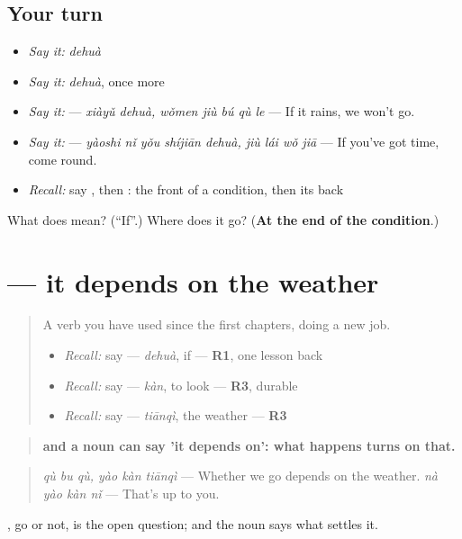 \subsection*{Your turn}
\begin{itemize}
\raggedright
  \item \emph{Say it:} \emph{dehuà}
  \item \emph{Say it:} \emph{dehuà}, once more
  \item \emph{Say it:}   — \emph{xiàyǔ dehuà, wǒmen jiù bú qù le} — If it rains, we won't go.
  \item \emph{Say it:}   — \emph{yàoshi nǐ yǒu shíjiān dehuà, jiù lái wǒ jiā} — If you've got time, come round.
  \item \emph{Recall:} say , then : the front of a condition, then its back
\end{itemize}

\begin{tcolorbox}[breakable,colback=teal!4,colframe=teal!35!black,title={Before you move on}]
What does  mean? (\textquotedblleft{}If\textquotedblright{}.) Where does it go? (\textbf{At the end of the condition}.)
\end{tcolorbox}
\section[\texorpdfstring{\zh{看天气} (kàn tiānqì)}{看天气 (kàn tiānqì)}]{ — it depends on the weather}

\label{lesson:ZH-C288-depends}



\begin{quote}
A verb you have used since the first chapters, doing a new job.

\begin{itemize}
\raggedright
  \item \emph{Recall:} say  — \emph{dehuà}, if — \textbf{R1}, one lesson back
  \item \emph{Recall:} say  — \emph{kàn}, to look — \textbf{R3}, durable
  \item \emph{Recall:} say  — \emph{tiānqì}, the weather — \textbf{R3}
\end{itemize}
\end{quote}

\begin{grammarlens}[title={Grammar Lens: \zh{看} and a noun, it depends on}]
\begin{quote}
\textbf{ and a noun can say 'it depends on': what happens turns on that.}
\end{quote}

\begin{quote}
\textbf{ } \emph{qù bu qù, yào kàn tiānqì} — Whether we go depends on the weather. \textbf{} \emph{nà yào kàn nǐ} — That's up to you.
\end{quote}

, go or not, is the open question;  and the noun says what settles it.
\end{grammarlens}


